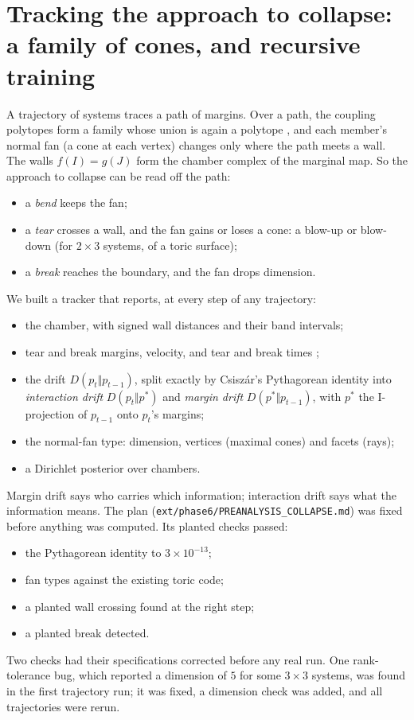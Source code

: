 \documentclass[11pt]{article}
\theoremstyle{definition}
\theoremstyle{remark}
\begin{document}
\section{Tracking the approach to collapse: a family of cones, and recursive training}\label{sec:collapse}

A trajectory of systems traces a path of margins. Over a path, the coupling polytopes form a family whose union is again a polytope
\cite[Prop.~6.1]{Bands}, and each member's normal fan (a cone at each vertex) changes only where the path meets a wall. The walls
$f(I)=g(J)$ form the chamber complex of the marginal map. So the approach to collapse can be read off the path:
\begin{itemize}[leftmargin=*,nosep]
\item a \emph{bend} keeps the fan;
\item a \emph{tear} crosses a wall, and the fan gains or loses a cone: a blow-up or blow-down (for $2\times3$ systems, of a toric surface);
\item a \emph{break} reaches the boundary, and the fan drops dimension.
\end{itemize}
We built a tracker that reports, at every step of any trajectory:
\begin{itemize}[leftmargin=*,nosep]
\item the chamber, with signed wall distances and their band intervals;
\item tear and break margins, velocity, and tear and break times \cite[Def.~3.1, Thm.~3.2, Def.~5.7]{Bands};
\item the drift $D(p_t\Vert p_{t-1})$, split exactly by Csiszár's Pythagorean identity into \emph{interaction drift} $D(p_t\Vert p^*)$
  and \emph{margin drift} $D(p^*\Vert p_{t-1})$, with $p^*$ the I-projection of $p_{t-1}$ onto $p_t$'s margins;
\item the normal-fan type: dimension, vertices (maximal cones) and facets (rays);
\item a Dirichlet posterior over chambers.
\end{itemize}
Margin drift says who carries which information; interaction drift says what the information means. The plan
(\texttt{ext/phase6/PREANALYSIS\_COLLAPSE.md}) was fixed before anything was computed. Its planted checks passed:
\begin{itemize}[leftmargin=*,nosep]
\item the Pythagorean identity to $3\times10^{-13}$;
\item fan types against the existing toric code;
\item a planted wall crossing found at the right step;
\item a planted break detected.
\end{itemize}
Two checks had their specifications corrected before any real run. One rank-tolerance bug, which reported a dimension of $5$ for some
$3\times3$ systems, was found in the first trajectory run; it was fixed, a dimension check was added, and all trajectories were rerun.
\end{document}
